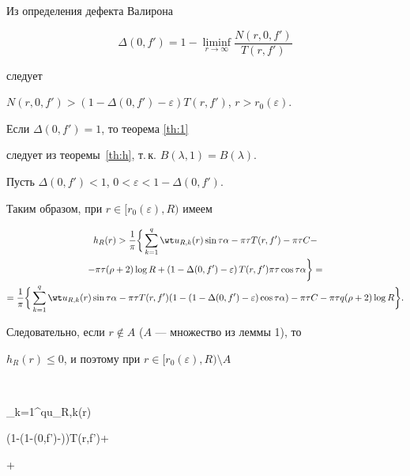 Из определения дефекта Валирона


$$


\Delta(0,f')=1-\liminf_{r\to\infty}\frac{N(r,0,f')}{T(r,f')}


$$


следует


$N(r,0,f')>(1-\Delta(0,f')-\varepsilon)T(r,f')$, $r>r_0(\varepsilon)$.


Если $\Delta(0,f')=1$, то теорема \ref{th:1}


следует из теоремы~\ref{th:h}, т.\,к. $B(\lambda,1)=B(\lambda)$.


Пусть $\Delta(0,f')<1$, $0<\varepsilon<1-\Delta(0,f')$.





Таким образом, при $r\in [r_0(\varepsilon),R)$ имеем


\begin{multline*}


h_{R}(r)>\frac{1}{\pi}\bigg\{


\sum\limits_{k=1}^{q}\wt u_{R,k}(r)\sin\tau\alpha


-\pi\tau T(r,f')-\pi\tau C- \\


%


-\pi\tau(\rho+2)\log R+\left(1-\Delta(0,f')-\varepsilon\right)T(r,f')


\pi\tau\cos\tau\alpha\bigg\}= \\


%


=\frac{1}{\pi}\bigg\{\sum\limits_{k=1}^{q}\wt u_{R,k}(r)\sin\tau\alpha


-\pi\tau T(r,f')(1-(1-\Delta(0,f')-\varepsilon)\cos\tau\alpha)-


\pi\tau C-


\pi\tau q(\rho+2)\log R\bigg\}.


\end{multline*}


Следовательно, если $r\notin A$ ($A$ --- множество из леммы 1), то 


$h_R(r)\le 0$, и поэтому при $r\in [r_0(\varepsilon),R)\setminus A$ 


$$


\sum\limits_{k=1}^{q}\wt u_{R,k}(r)\le \frac{\pi\tau}{\sin\tau\alpha}


(1-(1-\Delta(0,f')-\varepsilon)\cos\tau\alpha)T(r,f')+ 


+


